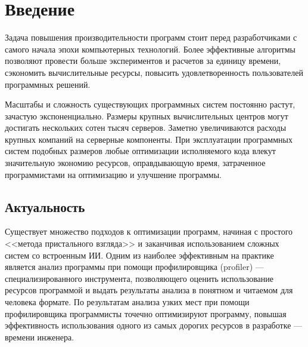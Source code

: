 \section{Введение}

Задача повышения производительности программ стоит перед разработчиками с самого начала эпохи компьютерных технологий.
Более эффективные алгоритмы позволяют провести больше экспериментов и расчетов за единицу времени,
сэкономить вычислительные ресурсы, повысить удовлетворенность пользователей программных решений.

Масштабы и сложность существующих программных систем постоянно растут, зачастую экспоненциально.
Размеры крупных вычислительных центров могут достигать нескольких сотен тысяч серверов.
Заметно увеличиваются расходы крупных компаний на серверные компоненты.
При эксплуатации программных систем подобных размеров любые оптимизации исполняемого кода влекут значительную экономию ресурсов, оправдывающую время, затраченное программистами на оптимизацию и улучшение программы.

\subsection{Актуальность}
Существует множество подходов к оптимизации программ, начиная с простого <<метода пристального взгляда>>
и заканчивая использованием сложных систем со встроенным ИИ.
Одним из наиболее эффективным на практике является анализ программы при помощи профилировщика (profiler)
--- специализированного инструмента, позволяющего оценить использование ресурсов программой
и выдать результаты анализа в понятном и читаемом для человека формате.
По результатам анализа узких мест при помощи профилировщика программисты точечно оптимизируют программу,
повышая эффективность использования одного из самых дорогих ресурсов в разработке --- времени инженера.

